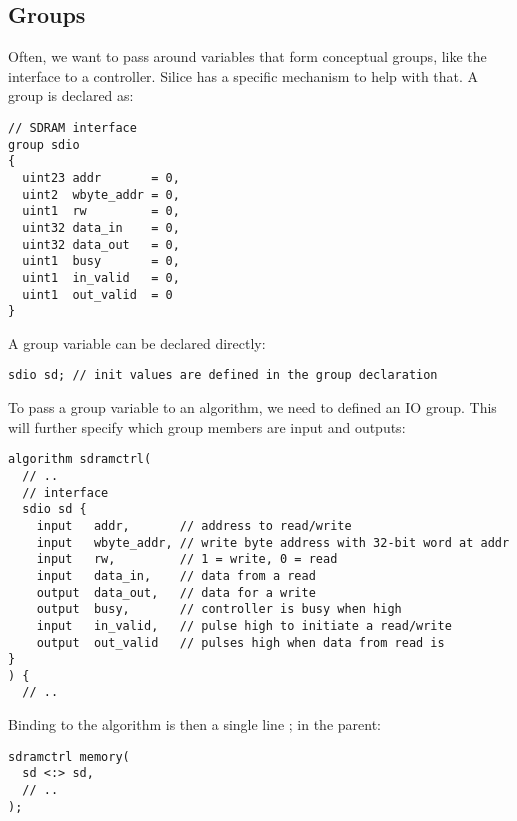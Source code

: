 \documentclass[a4]{article}
\newcommand\silice{Silice}
\begin{document}

\subsection{Groups}
\label{sec:groups}

Often, we want to pass around variables that form conceptual groups, like the interface to a controller. \silice{} has a specific mechanism to help with that. A group is declared as:

\begin{verbatim}
// SDRAM interface
group sdio
{
  uint23 addr       = 0,
  uint2  wbyte_addr = 0,
  uint1  rw         = 0,
  uint32 data_in    = 0,
  uint32 data_out   = 0,
  uint1  busy       = 0,
  uint1  in_valid   = 0,
  uint1  out_valid  = 0
}
\end{verbatim}

A group variable can be declared directly:
\begin{verbatim}
sdio sd; // init values are defined in the group declaration
\end{verbatim}

To pass a group variable to an algorithm, we need to defined an IO group. This will further specify which group members are input and outputs:

\begin{verbatim}
algorithm sdramctrl(
  // ..
  // interface
  sdio sd {
    input   addr,       // address to read/write
    input   wbyte_addr, // write byte address with 32-bit word at addr
    input   rw,         // 1 = write, 0 = read
    input   data_in,    // data from a read
    output  data_out,   // data for a write
    output  busy,       // controller is busy when high
    input   in_valid,   // pulse high to initiate a read/write
    output  out_valid   // pulses high when data from read is
}    
) {
  // ..
\end{verbatim}

Binding to the algorithm is then a single line ; in the parent:

\begin{verbatim}
sdramctrl memory(
  sd <:> sd,
  // ..
);
\end{verbatim}

\vspace*{5mm}
\noindent
{}
\end{document}
